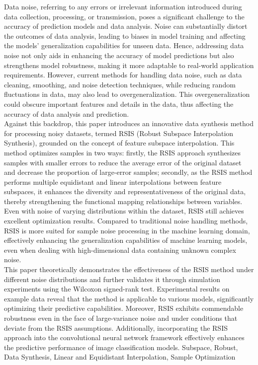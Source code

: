 \documentclass{NauThesis}
\begin{document}
\begin{EnAbstract}
    Data noise, referring to any errors or irrelevant information introduced during data collection, processing, or transmission, poses a significant challenge to the accuracy of prediction models and data analysis. Noise can substantially distort the outcomes of data analysis, leading to biases in model training and affecting the models' generalization capabilities for unseen data. Hence, addressing data noise not only aids in enhancing the accuracy of model predictions but also strengthens model robustness, making it more adaptable to real-world application requirements. However, current methods for handling data noise, such as data cleaning, smoothing, and noise detection techniques, while reducing random fluctuations in data, may also lead to overgeneralization. This overgeneralization could obscure important features and details in the data, thus affecting the accuracy of data analysis and prediction.
    \\\hspace*{2em}Against this backdrop, this paper introduces an innovative data synthesis method for processing noisy datasets, termed RSIS (Robust Subspace Interpolation Synthesis), grounded on the concept of feature subspace interpolation. This method optimizes samples in two ways: firstly, the RSIS approach synthesizes samples with smaller errors to reduce the average error of the original dataset and decrease the proportion of large-error samples; secondly, as the RSIS method performs multiple equidistant and linear interpolations between feature subspaces, it enhances the diversity and representativeness of the original data, thereby strengthening the functional mapping relationships between variables. Even with noise of varying distributions within the dataset, RSIS still achieves excellent optimization results. Compared to traditional noise handling methods, RSIS is more suited for sample noise processing in the machine learning domain, effectively enhancing the generalization capabilities of machine learning models, even when dealing with high-dimensional data containing unknown complex noise.
    \\\hspace*{2em}This paper theoretically demonstrates the effectiveness of the RSIS method under different noise distributions and further validates it through simulation experiments using the Wilcoxon signed-rank test. Experimental results on example data reveal that the method is applicable to various models, significantly optimizing their predictive capabilities. Moreover, RSIS exhibits commendable robustness even in the face of large-variance noise and under conditions that deviate from the RSIS assumptions. Additionally, incorporating the RSIS approach into the convolutional neural network framework effectively enhances the predictive performance of image classification models.
    \EnKeywords Subspace, Robust, Data Synthesis, Linear and Equidistant Interpolation, Sample Optimization
\end{EnAbstract}
\end{document}
